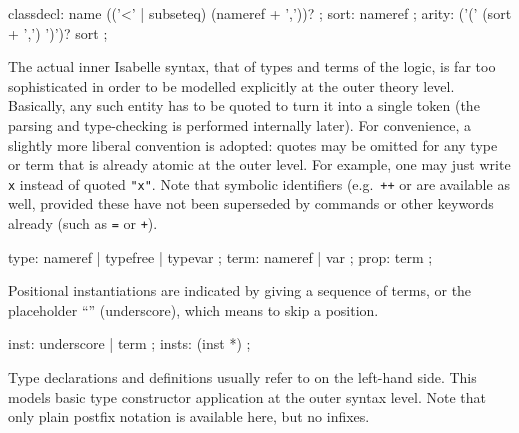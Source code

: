 \begin{isabellebody}
\begin{isamarkuptext}
  \begin{rail}
    classdecl: name (('<' | subseteq) (nameref + ','))?
    ;
    sort: nameref
    ;
    arity: ('(' (sort + ',') ')')? sort
    ;
  \end{rail}%
\end{isamarkuptext}%
\isamarkuptrue%
%
\isamarkuptrue%
%
\begin{isamarkuptext}%
The actual inner Isabelle syntax, that of types and terms of the
  logic, is far too sophisticated in order to be modelled explicitly
  at the outer theory level.  Basically, any such entity has to be
  quoted to turn it into a single token (the parsing and type-checking
  is performed internally later).  For convenience, a slightly more
  liberal convention is adopted: quotes may be omitted for any type or
  term that is already atomic at the outer level.  For example, one
  may just write \verb|x| instead of quoted \verb|"x"|.
  Note that symbolic identifiers (e.g.\ \verb|++| or \isa{{\isachardoublequote}{\isasymforall}{\isachardoublequote}} are available as well, provided these have not been superseded
  by commands or other keywords already (such as \verb|=| or
  \verb|+|).

  \begin{rail}
    type: nameref | typefree | typevar
    ;
    term: nameref | var
    ;
    prop: term
    ;
  \end{rail}

  Positional instantiations are indicated by giving a sequence of
  terms, or the placeholder ``\isa{{\isacharunderscore}}'' (underscore), which means to
  skip a position.

  \begin{rail}
    inst: underscore | term
    ;
    insts: (inst *)
    ;
  \end{rail}

  Type declarations and definitions usually refer to
   on the left-hand side.  This models basic
  type constructor application at the outer syntax level.  Note that
  only plain postfix notation is available here, but no infixes.


\end{isamarkuptext}
\end{isabellebody}
